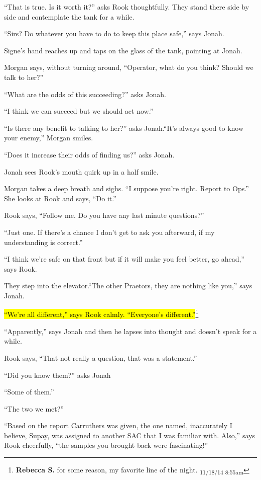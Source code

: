 ``That is true.  Is it worth it?'' asks Rook thoughtfully.  They stand there side by side and contemplate the tank for a while.

``Sirs?  Do whatever you have to do to keep this place safe,'' says Jonah.



Signe's hand reaches up and taps on the glass of the tank, pointing at Jonah.

Morgan says, without turning around, ``Operator, what do you think?  Should we talk to her?''

``What are the odds of this succeeding?'' asks Jonah.

``I think we can succeed but we should act now.''

``Is there any benefit to talking to her?'' asks Jonah.``It's always good to know your enemy,'' Morgan smiles.

``Does it increase their odds of finding us?'' asks Jonah.

Jonah sees Rook's mouth quirk up in a half smile.

Morgan takes a deep breath and sighs.  ``I suppose you're right.  Report to Ops.''  She looks at Rook and says, ``Do it.''



Rook says, ``Follow me. Do you have any last minute questions?''

``Just one.  If there's a chance I don't get to ask you afterward, if my understanding is correct.''

``I think we're safe on that front but if it will make you feel better, go ahead,'' says Rook.

They step into the elevator.``The other Praetors, they are nothing like you,'' says Jonah.

\hl{``We're all different,'' says Rook calmly.  ``Everyone's different.''}\footnote{\textbf{Rebecca S. }for some reason, my favorite line of the night. \textsubscript{11/18/14 8:55am}}

``Apparently,''  says Jonah and then he lapses into thought and doesn't speak for a while.

Rook says, ``That not really a question, that was a statement.''

``Did you know them?'' asks Jonah

``Some of them.''

``The two we met?''

``Based on the report Carruthers was given, the one named, inaccurately I believe, Supay, was assigned to another SAC that I was familiar with.  Also,'' says Rook cheerfully, ``the samples you brought back were fascinating!''

